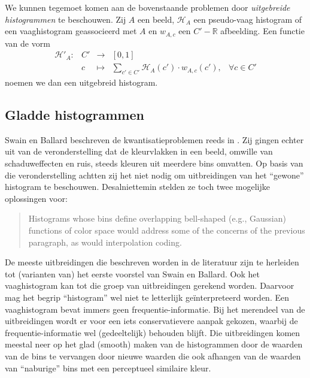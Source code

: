We kunnen tegemoet komen aan de bovenstaande problemen door \emph{uitgebreide
histogrammen} te beschouwen. 
Zij $A$ een beeld, $\mathcal{H}_A$ een pseudo-vaag histogram of een vaaghistogram
geassocieerd met $A$
en $w_{A,c}$ een $C' - \mathbb{R}$ afbeelding. Een functie van de vorm
$$
\begin{array}{rrcll}
\mathcal{H}'_A: 
 & C' & \to & [0,1] \\[2pt]
 & c  & \mapsto & \displaystyle\sum_{c' \in C'} \mathcal{H}_A(c') \cdot w_{A,c}(c'), & \forall c \in C'
\end{array}
$$ 
noemen we dan een uitgebreid histogram.


\subsection{Gladde histogrammen}

Swain en Ballard beschreven de kwantisatieproblemen reeds in \cite{swain:color_indexing}.
Zij gingen echter uit van de veronderstelling dat de kleurvlakken in een beeld,
omwille van schaduweffecten en ruis,
steeds kleuren uit meerdere bins omvatten. Op basis van die veronderstelling achtten zij
het niet nodig om uitbreidingen van het ``gewone'' histogram te beschouwen.
Desalniettemin stelden ze toch twee mogelijke oplossingen voor:
\begin{quote}
Histograms whose bins define overlapping bell-shaped (e.g., Gaussian) functions
of color space would address some of the concerns of the previous paragraph, as
would interpolation coding.
\end{quote}
De meeste uitbreidingen die beschreven worden in de literatuur 
\cite{jawahar:fuzzy_statistics_of_digital_images,
lu:perceptually_weighted_histograms_for_ir,
sural:perceptually_smooth_histogram,
vertan:embedding_fuzzy_logic_in_cbir, vertan:fuzzy_histograms} zijn
te herleiden tot (varianten van) het eerste voorstel van Swain en Ballard. Ook het
vaaghistogram kan tot die groep van uitbreidingen gerekend worden. Daarvoor mag het
begrip ``histogram'' wel niet te letterlijk ge\"interpreteerd worden. Een vaaghistogram
bevat immers geen frequentie-informatie. Bij het merendeel van de uitbreidingen wordt
er voor een iets conservatievere aanpak gekozen, waarbij de frequentie-informatie wel (gedeeltelijk)
behouden blijft. Die uitbreidingen komen meestal neer op het glad (smooth) maken van 
de histogrammen door de waarden van de bins te vervangen door nieuwe waarden die ook 
afhangen van de waarden van ``naburige'' bins met een perceptueel similaire kleur. 
 

